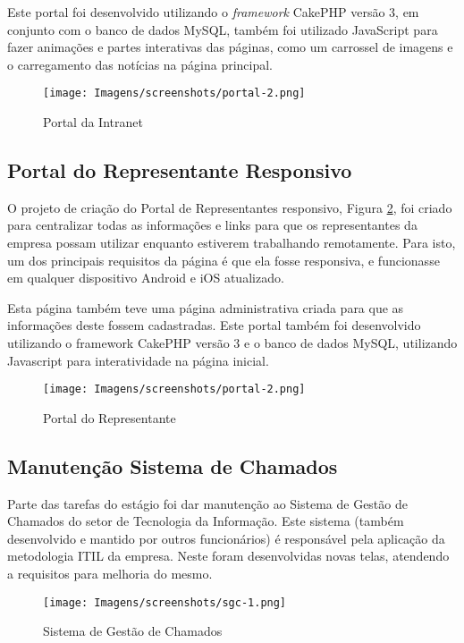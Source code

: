 Este portal foi desenvolvido utilizando o \textit{framework} CakePHP versão 3, em conjunto com o banco de dados MySQL, também foi utilizado JavaScript para fazer animações e partes interativas das páginas, como um carrossel de imagens e o carregamento das notícias na página principal.



\begin{figure}[h!]
  \centering
  \texttt{[image: Imagens/screenshots/portal-2.png]}
  \caption[Portal da Intranet]{Portal da Intranet}
  \label{fig:portal-1}
\end{figure}


\subsection{Portal do Representante Responsivo}

O projeto de criação do Portal de Representantes responsivo, Figura \ref{fig:portalrep-1}, foi criado para centralizar todas as informações e links para que os representantes da empresa possam utilizar enquanto estiverem trabalhando remotamente. Para isto, um dos principais requisitos da página é que ela fosse responsiva, e funcionasse em qualquer dispositivo Android e iOS atualizado. 

Esta página também teve uma página administrativa criada para que as informações deste fossem cadastradas. Este portal também foi desenvolvido utilizando o framework CakePHP versão 3 e o banco de dados MySQL, utilizando Javascript para interatividade na página inicial.



\begin{figure}[h!]
  \centering
  \texttt{[image: Imagens/screenshots/portal-2.png]}
  \caption[Portal do Representante]{Portal do Representante}
  \label{fig:portalrep-1}
\end{figure}



\subsection{Manutenção Sistema de Chamados}

Parte das tarefas do estágio foi dar manutenção ao Sistema de Gestão de Chamados do setor de Tecnologia da Informação. Este sistema (também desenvolvido e mantido por outros funcionários) é responsável pela aplicação da metodologia ITIL da empresa. Neste foram desenvolvidas novas telas, atendendo a requisitos para melhoria do mesmo.


\begin{figure}[h!]
  \centering
  \texttt{[image: Imagens/screenshots/sgc-1.png]}
  \caption[Sistema de Gestão de Chamados]{Sistema de Gestão de Chamados}
  \label{fig:sgc-1}
\end{figure}
